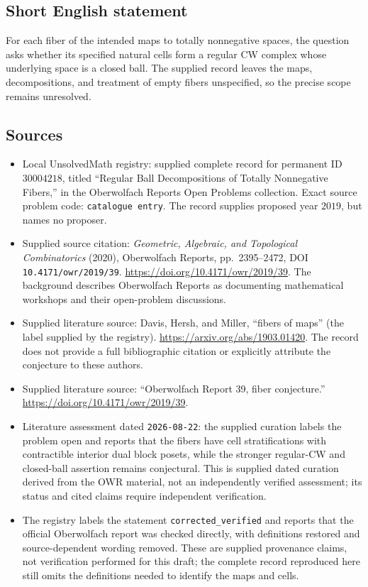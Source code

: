\documentclass[11pt]{article}
\begin{document}
\subsection{Short English statement}
For each fiber of the intended maps to totally nonnegative spaces, the question asks whether its specified natural cells form a regular CW complex whose underlying space is a closed ball. The supplied record leaves the maps, decompositions, and treatment of empty fibers unspecified, so the precise scope remains unresolved.
\subsection{Sources}
\begin{itemize}
\item Local UnsolvedMath registry: supplied complete record for permanent ID \(30004218\), titled ``Regular Ball Decompositions of Totally Nonnegative Fibers,'' in the Oberwolfach Reports Open Problems collection. Exact source problem code: \texttt{catalogue entry}. The record supplies proposed year \(2019\), but names no proposer.
\item Supplied source citation: \emph{Geometric, Algebraic, and Topological Combinatorics} (2020), Oberwolfach Reports, pp.~2395--2472, DOI \texttt{10.4171/owr/2019/39}. \url{https://doi.org/10.4171/owr/2019/39}. The background describes Oberwolfach Reports as documenting mathematical workshops and their open-problem discussions.
\item Supplied literature source: Davis, Hersh, and Miller, ``fibers of maps'' (the label supplied by the registry). \url{https://arxiv.org/abs/1903.01420}. The record does not provide a full bibliographic citation or explicitly attribute the conjecture to these authors.
\item Supplied literature source: ``Oberwolfach Report 39, fiber conjecture.'' \url{https://doi.org/10.4171/owr/2019/39}.
\item Literature assessment dated \texttt{2026-08-22}: the supplied curation labels the problem open and reports that the fibers have cell stratifications with contractible interior dual block posets, while the stronger regular-CW and closed-ball assertion remains conjectural. This is supplied dated curation derived from the OWR material, not an independently verified assessment; its status and cited claims require independent verification.
\item The registry labels the statement \texttt{corrected\_verified} and reports that the official Oberwolfach report was checked directly, with definitions restored and source-dependent wording removed. These are supplied provenance claims, not verification performed for this draft; the complete record reproduced here still omits the definitions needed to identify the maps and cells.
\end{itemize}
\end{document}
